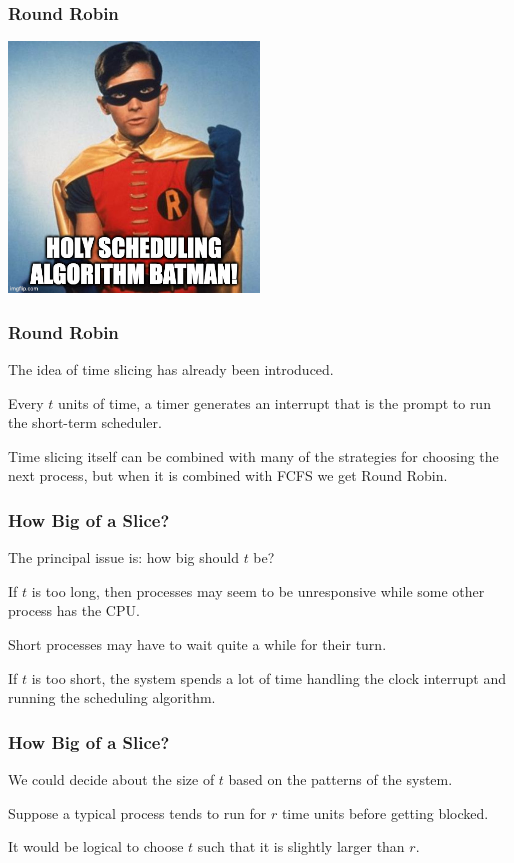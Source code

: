 \begin{frame}
\frametitle{Round Robin}

\begin{center}
	\includegraphics[width=0.5\textwidth]{images/roundrobin.jpg}
\end{center}


\end{frame}


\begin{frame}
\frametitle{Round Robin}

The idea of time slicing has already been introduced. 

Every $t$ units of time, a timer generates an interrupt that is the prompt to run the short-term scheduler. 

Time slicing itself can be combined with many of the strategies for choosing the next process, but when it is combined with FCFS we get Round Robin. 


\end{frame}

\begin{frame}
\frametitle{How Big of a Slice?}

The principal issue is: how big should $t$ be? 

If $t$ is too long, then processes may seem to be unresponsive while some other process has the CPU. 

Short processes may have to wait quite a while for their turn.

If $t$ is too short, the system spends a lot of time handling the clock interrupt and running the scheduling algorithm.


\end{frame}

\begin{frame}
\frametitle{How Big of a Slice?}

We could decide about the size of $t$ based on the patterns of the system. 

Suppose a typical process tends to run for $r$ time units before getting blocked.

It would be logical to choose $t$ such that it is slightly larger than $r$. 

\end{frame}

